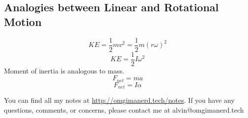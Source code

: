 \documentclass{math}
\begin{document}
\subsection*{Analogies between Linear and Rotational Motion}
\[ KE = \frac{1}{2}mv^2 = \frac{1}{2}m(r\omega)^2 \]
\[ KE = \frac{1}{2}I\omega^2 \]
Moment of inertia is analogous to mass.
\[ F_{net} = ma \]
\[ F_{net} = I\alpha \]

\begin{center}
  You can find all my notes at \url{http://omgimanerd.tech/notes}. If you have
  any questions, comments, or concerns, please contact me at
  alvin@omgimanerd.tech
\end{center}
\end{document}
